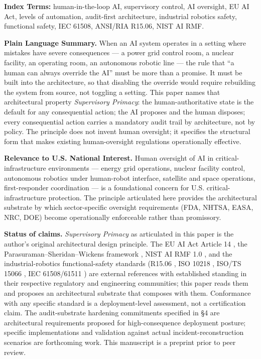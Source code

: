 \textbf{Index Terms:} human-in-the-loop AI, supervisory control, AI
oversight, EU AI Act, levels of automation, audit-first architecture,
industrial robotics safety, functional safety, IEC 61508, ANSI/RIA
R15.06, NIST AI RMF.

\textbf{Plain Language Summary.} When an AI system operates in a setting
where mistakes have severe consequences --- a power grid control room, a
nuclear facility, an operating room, an autonomous robotic line --- the
rule that ``a human can always override the AI'' must be more than a
promise. It must be built into the architecture, so that disabling the
override would require rebuilding the system from source, not toggling a
setting. This paper names that architectural property \emph{Supervisory
Primacy}: the human-authoritative state is the default for any
consequential action; the AI proposes and the human disposes; every
consequential action carries a mandatory audit trail by architecture,
not by policy. The principle does not invent human oversight; it
specifies the structural form that makes existing human-oversight
regulations operationally effective.

\textbf{Relevance to U.S. National Interest.} Human oversight of AI in
critical-infrastructure environments --- energy grid operations, nuclear
facility control, autonomous robotics under human-robot interface,
satellite and space operations, first-responder coordination --- is a
foundational concern for U.S. critical-infrastructure protection. The
principle articulated here provides the architectural substrate by which
sector-specific oversight requirements (FDA, NHTSA, EASA, NRC, DOE)
become operationally enforceable rather than promissory.

\textbf{Status of claims.} \emph{Supervisory Primacy} as articulated in
this paper is the author's original architectural design principle. The
EU AI Act Article 14 \cite{ref1}, the Parasuraman--Sheridan--Wickens
framework \cite{ref2}, NIST AI RMF 1.0 \cite{ref9}, and the industrial-robotics
functional-safety standards (R15.06 \cite{ref11}, ISO 10218 \cite{ref12}, ISO/TS
15066 \cite{ref13}, IEC 61508/61511 \cite{ref14}) are external references with
established standing in their respective regulatory and engineering
communities; this paper reads them and proposes an architectural
substrate that composes with them. Conformance with any specific
standard is a deployment-level assessment, not a certification claim.
The audit-substrate hardening commitments specified in §4 are
architectural requirements proposed for high-consequence deployment
posture; specific implementations and validation against actual
incident-reconstruction scenarios are forthcoming work. This manuscript
is a preprint prior to peer review.

